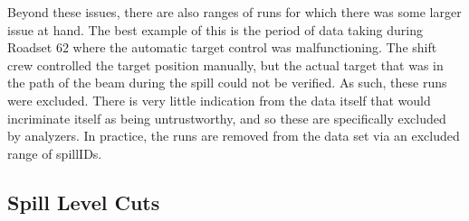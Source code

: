 Beyond these issues, there are also ranges of runs for which there was some larger issue at hand. The best example of this is the period of data taking during Roadset 62 where the automatic target control was malfunctioning. The shift crew controlled the target position manually, but the actual target that was in the path of the beam during the spill could not be verified. As such, these runs were excluded. There is very little indication from the data itself that would incriminate itself as being untrustworthy, and so these are specifically excluded by analyzers. In practice, the runs are removed from the data set via an excluded range of spillIDs.

\subsection{Spill Level Cuts}

